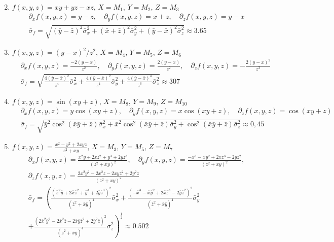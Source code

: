 \documentclass[11pt,answers]{exam}
\begin{document}
\begin{questions}
\begin{solution}
\begin{enumerate}
\begin{align*}
\end{align*}
\item $f(x,y,z)=xy+yz-xz$, $X=M_1$, $Y=M_2$, $Z=M_3$
\begin{align*}
	&
	\partial_xf(x,y,z)=y-z
	,\quad
	\partial_yf(x,y,z)=x+z
	,\quad
	\partial_zf(x,y,z)=y-x
	\\
	&
	\bar \sigma_{f}=
	\sqrt{
		(\bar y - \bar z)^2\bar\sigma_x^2
		+
		(\bar x + \bar z)^2\bar\sigma_y^2
		+
		(\bar y - \bar x)^2\bar\sigma_z^2
	}
	\approx 3.65
\end{align*}
\item $f(x,y,z)=(y-x)^2/z^2$, $X=M_4$, $Y=M_5$, $Z=M_6$
\begin{align*}
	&
	\partial_xf(x,y,z)=\frac{-2(y-x)}{z^2}
	,\quad
	\partial_yf(x,y,z)=\frac{2(y-x)}{z^2}
	,\quad
	\partial_zf(x,y,z)=-\frac{2(y-x)^2}{z^3}
	\\
	&
	\bar \sigma_{f}=
	\sqrt{
		\frac{4(\bar y-\bar x)^2}{\bar z^4}\bar\sigma_x^2
		+
		\frac{4(\bar y-\bar x)^2}{\bar z^4}\bar\sigma_y^2
		+
		\frac{4(\bar y-\bar x)^4}{\bar z^6}\bar\sigma_z^2
	}
	\approx 307
\end{align*}
\item $f(x,y,z)=\sin(xy+z)$, $X=M_8$, $Y=M_9$, $Z=M_{10}$
\begin{align*}
&
\partial_xf(x,y,z)=y\cos(xy+z)
,\quad
\partial_yf(x,y,z)=x\cos(xy+z)
,\quad
\partial_zf(x,y,z)=\cos(xy+z)
\\
&
\bar \sigma_{f}=
\sqrt{
\bar y^2\cos^2(\bar x\bar y+\bar z)\bar\sigma_x^2
+
\bar x^2\cos^2(\bar x\bar y+\bar z)\bar\sigma_y^2
+
\cos^2(\bar x\bar y+\bar z)\bar\sigma_z^2
}
\approx 0,45
\end{align*}
\item $f(x,y,z)=\frac{x^2-y^2+2xyz}{z^2+xy}$, $X=M_3$, $Y=M_5$, $Z=M_7$
\begin{align*}
	&
	\partial_xf(x,y,z)=\frac{x^2y+2xz^2+y^3+2yz^3}{(z^2+xy)^2}
	,\quad
	\partial_yf(x,y,z)=\frac{-x^3-xy^2+2xz^3-2yz^2}{(z^2+xy)^2}
	,\\
	&\partial_zf(x,y,z)=\frac{2x^2y^2-2x^2z-2xyz^2+2y^2z}{(z^2+xy)^2}
	\\
	&
	\bar \sigma_{f}=
	\left(
		\frac{(\bar x^2\bar y+2\bar x\bar z^2+\bar y^3+2\bar y\bar z^3)^2}{(\bar z^2+\bar x\bar y)^4}\bar\sigma_x^2
		+
		\frac{(-\bar x^3-\bar x\bar y^2+2\bar x\bar z^3-2\bar y\bar z^2)^2}{(\bar z^2+\bar x\bar y)^4}\bar\sigma_y^2\right.\\&\left.
		+
		\frac{(2\bar x^2\bar y^2-2\bar x^2\bar z-2\bar x\bar y\bar z^2+2\bar y^2\bar z)^2}{(\bar z^2+\bar x\bar y)^4}\bar\sigma_z^2
	\right)^\frac{1}{2}
	\approx 0.502
\end{align*}

\end{enumerate}
\end{solution}


\end{questions}
\end{document}
